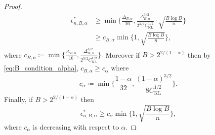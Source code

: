 \documentclass{article}
\theoremstyle{plain}
\theoremstyle{definition}
\theoremstyle{remark}
\begin{document}
\begin{proof}
\begin{align*}
      \epsilon^*_{n,B, \alpha} 
     &\geq \min \Big\{ \frac{\Delta_{B, \alpha}}{16} , \frac{\Delta_{B, \alpha}^{3/2}}{2^{3/2}  C_\mathrm{KL}^{1/2}} \cdot \sqrt{\frac{B \log B}{n}} \Big \} \\
     &\geq c_{B, \alpha} \min \Big \{ 1, \sqrt{\frac{B \log B}{n}} \Big \},
\end{align*}
where $c_{B, \alpha} \coloneqq \min \Big \{ \frac{\Delta_{B, \alpha}}{16}, \frac{\Delta_{B, \alpha}^{3/2}}{2^{3/2}  C_\mathrm{KL}^{1/2}}  \Big \}.$
Moreover if $B > 2^{2/(1- \alpha)}$ then by \eqref{eq:B_condition_alpha}, $c_{B, \alpha} \geq c_\alpha$ where
$$c_{\alpha} \coloneqq \min \Big \{ \frac{1 - \alpha}{32}, \frac{(1-\alpha)^{3/2}}{8  C_\mathrm{KL}^{1/2}}  \Big \}.$$
Finally, if $B > 2^{2/(1- \alpha)}$ then 
\begin{equation}
   \epsilon^*_{n,B, \alpha}  \geq c_{ \alpha} \min \Big \{ 1, \sqrt{\frac{B \log B}{n}} \Big \},
\end{equation}
where $c_\alpha$ is decreasing with respect to $\alpha$.


    
\end{proof}
\end{document}
